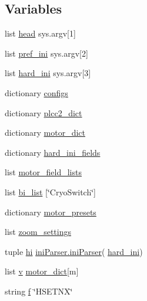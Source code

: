 \subsection*{Variables}
\begin{DoxyCompactItemize}
\item 
list \hyperlink{namespacemk__pgpmac__redis_a760ff4955cbf5beef4ae36a28c30b01a}{head} sys.\-argv\mbox{[}1\mbox{]}
\item 
list \hyperlink{namespacemk__pgpmac__redis_a38c785af5201403976e1267c47ea5096}{pref\-\_\-ini} sys.\-argv\mbox{[}2\mbox{]}
\item 
list \hyperlink{namespacemk__pgpmac__redis_a5864d9c27cbe61534756880cbfebe4f1}{hard\-\_\-ini} sys.\-argv\mbox{[}3\mbox{]}
\item 
dictionary \hyperlink{namespacemk__pgpmac__redis_a9dc9b1bd47efd207604312cd60637526}{configs}
\item 
dictionary \hyperlink{namespacemk__pgpmac__redis_a70d6a840305f17ce4f2936166fa2750e}{plcc2\-\_\-dict}
\item 
dictionary \hyperlink{namespacemk__pgpmac__redis_ad8583d4fe88c4c98af73d2858c51c660}{motor\-\_\-dict}
\item 
dictionary \hyperlink{namespacemk__pgpmac__redis_a8257226983aee079ec66f5cc67e194ec}{hard\-\_\-ini\-\_\-fields}
\item 
list \hyperlink{namespacemk__pgpmac__redis_a7228dc1b6ecec376538db1efe8c05ffb}{motor\-\_\-field\-\_\-lists}
\item 
list \hyperlink{namespacemk__pgpmac__redis_a961bfabfbdcbf5b749f6e6ecdc733619}{bi\-\_\-list} \mbox{[}\char`\"{}Cryo\-Switch\char`\"{}\mbox{]}
\item 
dictionary \hyperlink{namespacemk__pgpmac__redis_a2a04d8d0b7270384d1fac674c29e774a}{motor\-\_\-presets}
\item 
list \hyperlink{namespacemk__pgpmac__redis_ad91bac9be746f99e1cf1f8e28ff348be}{zoom\-\_\-settings}
\item 
tuple \hyperlink{namespacemk__pgpmac__redis_af0e472a4df25fc5c1660ef07226689a8}{hi} \hyperlink{classiniParser_1_1iniParser}{ini\-Parser.\-ini\-Parser}( \hyperlink{namespacemk__pgpmac__redis_a5864d9c27cbe61534756880cbfebe4f1}{hard\-\_\-ini})
\item 
list \hyperlink{namespacemk__pgpmac__redis_ac732d49b0afca9a9951e3a252bae42fc}{v} \hyperlink{namespacemk__pgpmac__redis_ad8583d4fe88c4c98af73d2858c51c660}{motor\-\_\-dict}\mbox{[}m\mbox{]}
\item 
string \hyperlink{namespacemk__pgpmac__redis_a057fe7457503e0de97edcf855591ed58}{f} \char`\"{}H\-S\-E\-T\-N\-X\char`\"{}

\end{DoxyCompactItemize}
